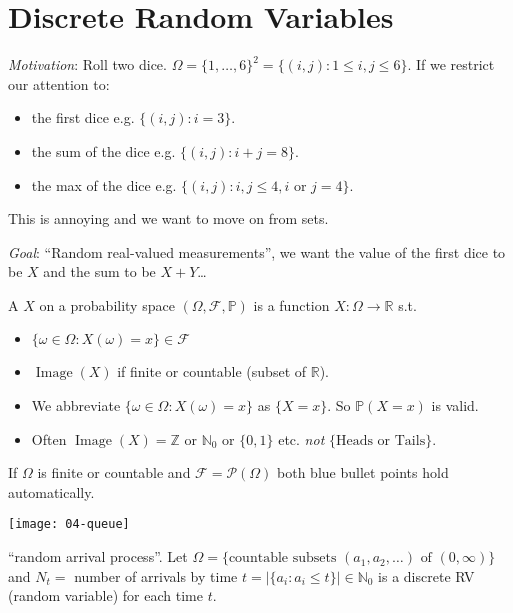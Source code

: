 \section{Discrete Random Variables}
\emph{Motivation}: Roll two dice.
$\Omega = \{1, \dots, 6\}^2 = \{(i, j) : 1 \leq i, j \leq 6\}.$
If we restrict our attention to:
\begin{itemize}
    \item the first dice e.g. $\{(i, j) : i = 3\}$.
    \item the sum of the dice e.g. $\{(i, j) : i + j = 8\}$.
    \item the max of the dice e.g. $\{(i, j) : i, j \leq 4, i \text{ or } j = 4\}$.
\end{itemize} 
This is annoying and we want to move on from sets.

\emph{Goal}: ``Random real-valued measurements'', we want the value of the first dice to be $X$ and the sum to be $X + Y$\dots

\begin{definition}
    A  $X$ on a probability space $(\Omega, \mathcal{F}, \mathbb{P})$ is a function $X : \Omega \to \mathbb{R}$ \color{blue} s.t. 
    \begin{itemize}
        \item $\{ \omega \in \Omega : X(\omega) = x\} \in \mathcal{F}$
        \item $\operatorname{Image}(X)$ if finite or countable (subset of $\mathbb{R}$).
    \end{itemize}
    \color{red} 
    \begin{itemize}
        \item We abbreviate $\{ \omega \in \Omega : X(\omega) = x\}$ as $\{X = x\}$. So $\mathbb{P}(X = x)$ is valid.
        \item Often $\operatorname{Image}(X) = \mathbb{Z}$ or $\mathbb{N}_0$ or $\{0, 1\}$ etc. \emph{not} $\{\text{Heads or Tails}\}$. 
    \end{itemize} \color{black}
    If $\Omega$ is finite or countable and $\mathcal{F} = \mathcal{P}(\Omega)$ both blue bullet points hold automatically.
\end{definition} 

\begin{example} \mbox{}
    {\par \centering \texttt{[image: 04-queue]} \par}
    ``random arrival process''.
    Let $\Omega = \{\text{countable subsets } (a_1, a_2, \dots) \text{ of } (0, \infty)\}$ and $N_t =$ number of arrivals by time $t = |\{a_i : a_i \leq t\}| \in \mathbb{N}_0$ is a discrete RV (random variable) for each time $t$.
\end{example} 

